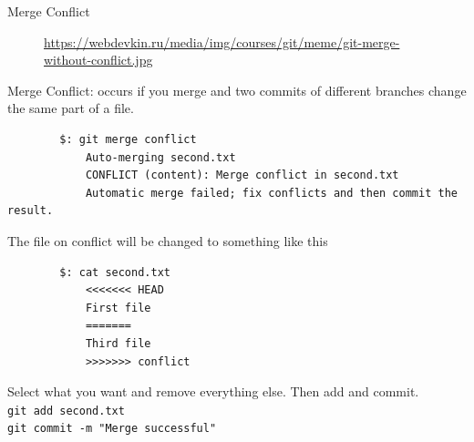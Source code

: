 \begin{frame}{Merge Conflict}
	\begin{figure}
		\centering
		\caption{\url{https://webdevkin.ru/media/img/courses/git/meme/git-merge-without-conflict.jpg}}
	\end{figure}
	
	\framebreak
	
	Merge Conflict: occurs if you merge and two commits of different branches change the same part of a file.
	\begin{lstlisting}
		$: git merge conflict 
			Auto-merging second.txt
			CONFLICT (content): Merge conflict in second.txt
			Automatic merge failed; fix conflicts and then commit the result.
	\end{lstlisting}
	\framebreak
	The file on conflict will be changed to something like this
	\begin{lstlisting}
		$: cat second.txt 
			<<<<<<< HEAD
			First file
			=======
			Third file
			>>>>>>> conflict
	\end{lstlisting}
	Select what you want and remove everything else. Then add and commit.\\
	\texttt{git add second.txt}\\
	\texttt{git commit -m "Merge successful"}
\end{frame}
